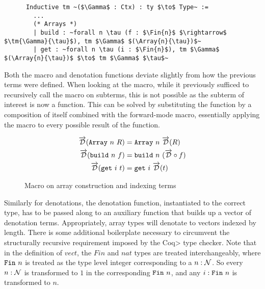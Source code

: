   \begin{listing}
    \begin{verbatim}
      Inductive tm ~($\Gamma$ : Ctx) : ty $\to$ Type~ :=
        ...
        (* Arrays *)
        | build : ~forall n \tau (f : $\Fin{n}$ $\rightarrow$ $\tm{\Gamma}{\tau}$), tm $\Gamma$ $(\Array{n}{\tau})$~
        | get : ~forall n \tau (i : $\Fin{n}$), tm $\Gamma$ $(\Array{n}{\tau})$ $\to$ tm $\Gamma$ $\tau$~
    \end{verbatim}
    \caption{The terms related to array types included in our language}
    \label{lst:tm_array}
  \end{listing}

  Both the macro and denotation functions deviate slightly from how the previous terms were defined.
  When looking at the macro, while it previously sufficed to recursively call the macro on subterms, this is not possible as the subterm of interest is now a function.
  This can be solved by substituting the function by a composition of itself combined with the forward-mode macro, essentially applying the macro to every possible result of the function.

  \begin{figure}
    \centering
    \begin{equation*}
      \begin{split}
        \overrightarrow{\mathcal{D}}(\texttt{Array}\ n\ R) &= \texttt{Array}\ n\ \overrightarrow{\mathcal{D}}(R) \\
        \overrightarrow{\mathcal{D}}(\texttt{build}\ n\ f) &= \texttt{build}\ n\ (\overrightarrow{\mathcal{D}} \circ f) \\
        \overrightarrow{\mathcal{D}}(\texttt{get}\ i\ t) &= \texttt{get}\ i\ \overrightarrow{\mathcal{D}}(t)
      \end{split}
    \end{equation*}
    \caption{Macro on array construction and indexing terms}
    \label{eqn:macro_array}
  \end{figure}

  Similarly for denotations, the denotation function, instantiated to the correct type, has to be passed along to an auxiliary function that builds up a vector of denotation terms.
  Appropriately, array types will denotate to vectors indexed by length.
  There is some additional boilerplate necessary to circumvent the structurally recursive requirement imposed by the \<Coq> type checker.
  Note that in the definition of $vect$, the $Fin$ and $nat$ types are treated interchangeably, where $\texttt{Fin}\ n$ is treated as the type level integer corresponding to a $n : \mathcal{N}$.
  So every $n : \mathcal{N}$ is transformed to $1$ in the corresponding $\texttt{Fin}\ n$, and any $i : \texttt{Fin}\ n$ is transformed to $n$.

